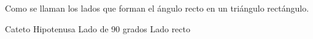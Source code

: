 
\question Como se llaman los lados que forman el ángulo recto en un
          triángulo rectángulo.

  \begin{oneparchoices}
    \CorrectChoice Cateto
    \choice Hipotenusa
    \choice Lado de 90 grados
    \choice Lado recto
  \end{oneparchoices}
  \answerline[A]
